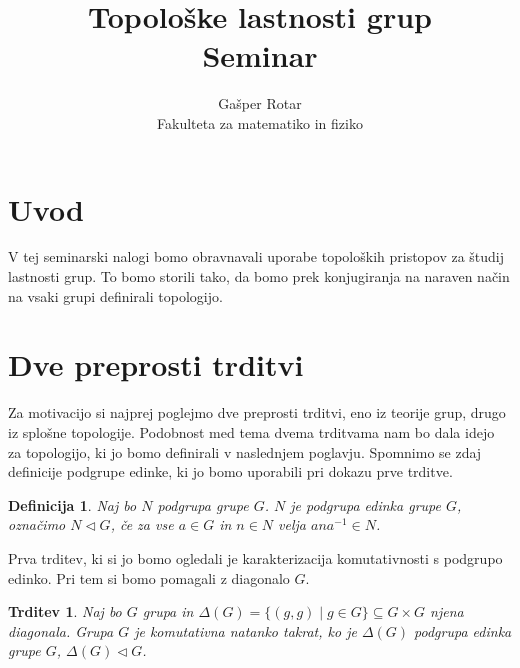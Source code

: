 \documentclass[a4paper,12pt]{article}
\title{Topološke lastnosti grup \\ 
\Large Seminar}
\author{Gašper Rotar \\
Fakulteta za matematiko in fiziko}
\newtheorem{trditev}{Trditev}
\newtheorem{definicija}{Definicija}
\begin{document}
\maketitle

\section{Uvod}

V tej seminarski nalogi bomo obravnavali uporabe topoloških pristopov za študij lastnosti grup.
To bomo storili tako, da bomo prek konjugiranja na naraven način na vsaki grupi definirali topologijo.



\section{Dve preprosti trditvi}

Za motivacijo si najprej poglejmo dve preprosti trditvi, eno iz teorije grup, drugo iz splošne topologije.
Podobnost med tema dvema trditvama nam bo dala idejo za topologijo, ki jo bomo definirali v naslednjem poglavju.
Spomnimo se zdaj definicije podgrupe edinke, ki jo bomo uporabili pri dokazu prve trditve.

\begin{definicija}
    Naj bo $N$ podgrupa grupe $G$. $N$ je podgrupa \emph{edinka} grupe $G$, označimo $N \triangleleft G$, če za vse $a \in G$ in $n \in N$ velja $ana^{-1} \in N$.
\end{definicija}


Prva trditev, ki si jo bomo ogledali je karakterizacija komutativnosti s podgrupo edinko. Pri tem si bomo pomagali z diagonalo $G$.

\begin{trditev}
    Naj bo $G$ grupa in $\Delta(G) = \{(g,g) \mid g \in G \} \subseteq G \times G$ njena diagonala.
    Grupa $G$ je komutativna natanko takrat, ko je $\Delta(G)$ podgrupa edinka grupe $G$, $\Delta(G) \triangleleft G$.
\end{trditev}
\end{document}
